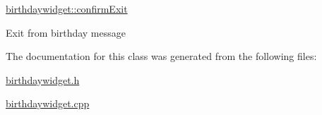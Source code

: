 \hyperlink{classbirthdaywidget_a099d4cbfc1b9bb95dd358325498832f8}{birthdaywidget\-::confirm\-Exit} 

Exit from birthday message 

The documentation for this class was generated from the following files\-:\begin{DoxyCompactItemize}
\item 
\hyperlink{birthdaywidget_8h}{birthdaywidget.\-h}\item 
\hyperlink{birthdaywidget_8cpp}{birthdaywidget.\-cpp}\end{DoxyCompactItemize}
